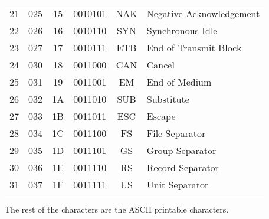 \documentclass[a4paper, 12pt]{report}
\theoremstyle{remark}
\theoremstyle{definition}
\begin{document}
\begin{center}
{\begin{tabular}{ |c|c|c|c|c|l| }
21 & 025 & 15 & 0010101 & NAK & Negative Acknowledgement\\
22 & 026 & 16 & 0010110 & SYN & Synchronous Idle \\
23 & 027 & 17 & 0010111 & ETB & End of Transmit Block\\
24 & 030 & 18 & 0011000 & CAN & Cancel\\
25 & 031 & 19 & 0011001 & EM & End of Medium\\
26 & 032 & 1A & 0011010 & SUB & Substitute\\
27 & 033 & 1B & 0011011 & ESC & Escape\\
28 & 034 & 1C & 0011100 & FS & File Separator \\
29 & 035 & 1D & 0011101 & GS & Group Separator\\
30 & 036 & 1E & 0011110 & RS & Record Separator \\
31 & 037 & 1F & 0011111 & US & Unit Separator\\
\hline
\end{tabular}}
\end{center}

The rest of the characters are the ASCII printable characters. 
\end{document}
